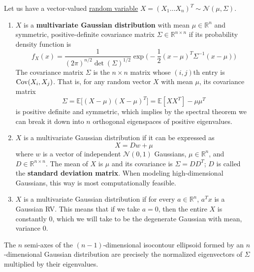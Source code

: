   \begin{definition}
    \label{def:multivariate-gaussian}
		Let us have a vector-valued \hyperref[def:random-variable]{random variable} $X = (X_1 \ldots X_n)^T \sim \mathcal{N}(\mu, \Sigma)$. 
		\begin{enumerate}
			\item $X$ is a \textbf{multivariate Gaussian distribution} with mean $\mu \in \mathbb{R}^n$ and symmetric, positive-definite covariance matrix $\Sigma \in \mathbb{R}^{n \times n}$ if its probability density function is
			\begin{equation}
			  f_X (x) = \frac{1}{(2\pi)^{n/2} \det(\Sigma)^{1/2}} \exp\bigg( -\frac{1}{2} (x-\mu)^T \Sigma^{-1} (x - \mu)\bigg)
			\end{equation}
			The covariance matrix $\Sigma$ is the $n \times n$ matrix whose $(i, j)$th entry is $\operatorname{Cov}(X_i, X_j)$. That is, for any random vector $X$ with mean $\mu$, its covariance matrix 
			\begin{equation}
			  \Sigma = \mathbb{E}\big[ (X - \mu) (X - \mu)^T \big] = \mathbb{E}[X X^T] - \mu \mu^T
			\end{equation}
			is positive definite and symmetric, which implies by the spectral theorem we can break it down into $n$ orthogonal eigenspaces of positive eigenvalues. 

			\item $X$ is a multivariate Gaussian distribution if it can be expressed as 
			\begin{equation}
			  X = D w + \mu
			\end{equation}
			where $w$ is a vector of independent $\mathcal{N}(0, 1)$ Gaussians, $\mu \in \mathbb{R}^n$, and $D \in \mathbb{R}^{n \times n}$. The mean of $X$ is $\mu$ and its covariance is $\Sigma = D D^T$; $D$ is called the \textbf{standard deviation matrix}. When modeling high-dimensional Gaussians, this way is most computationally feasible. 

			\item $X$ is a multivariate Gaussian distribution if for every $a \in \mathbb{R}^n$, $a^T x$ is a Gaussian RV. This means that if we take $a = 0$, then the entire $X$ is constantly $0$, which we will take to be the degenerate Gaussian with mean, variance $0$. 
		\end{enumerate}
		The $n$ semi-axes of the $(n-1)$-dimensional isocontour ellipsoid formed by an $n$-dimensional Gaussian distribution are precisely the normalized eigenvectors of $\Sigma$ multiplied by their eigenvalues. 
  \end{definition}

